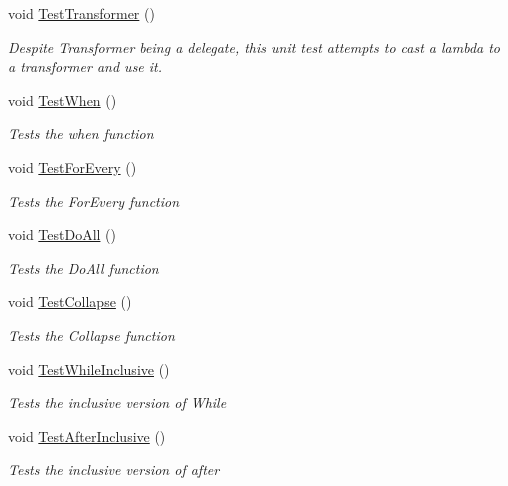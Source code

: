 \begin{DoxyCompactItemize}
\item 
void \hyperlink{classHumDrumTests_1_1Collections_1_1HigherOrder_a09af15fa7e15d1ae88a4a7718465654b}{Test\+Transformer} ()
\begin{DoxyCompactList}\small\item\em Despite Transformer being a delegate, this unit test attempts to cast a lambda to a transformer and use it. \end{DoxyCompactList}\item 
void \hyperlink{classHumDrumTests_1_1Collections_1_1HigherOrder_a35e3afe33158ce1accc409bc869216a7}{Test\+When} ()
\begin{DoxyCompactList}\small\item\em Tests the when function \end{DoxyCompactList}\item 
void \hyperlink{classHumDrumTests_1_1Collections_1_1HigherOrder_a519e1c69f362f59539ae3eaa4869c0cb}{Test\+For\+Every} ()
\begin{DoxyCompactList}\small\item\em Tests the For\+Every function \end{DoxyCompactList}\item 
void \hyperlink{classHumDrumTests_1_1Collections_1_1HigherOrder_ac3555e9c4aec3e6aa8de2e95d929f502}{Test\+Do\+All} ()
\begin{DoxyCompactList}\small\item\em Tests the Do\+All function \end{DoxyCompactList}\item 
void \hyperlink{classHumDrumTests_1_1Collections_1_1HigherOrder_af65ffefc188272daf9b07528d102f9ed}{Test\+Collapse} ()
\begin{DoxyCompactList}\small\item\em Tests the Collapse function \end{DoxyCompactList}\item 
void \hyperlink{classHumDrumTests_1_1Collections_1_1HigherOrder_a9de424bcbef678ad1207d2a4000bb760}{Test\+While\+Inclusive} ()
\begin{DoxyCompactList}\small\item\em Tests the inclusive version of While \end{DoxyCompactList}\item 
void \hyperlink{classHumDrumTests_1_1Collections_1_1HigherOrder_aa93ecf5ef2d168796281d23c624bbbb3}{Test\+After\+Inclusive} ()
\begin{DoxyCompactList}\small\item\em Tests the inclusive version of after \end{DoxyCompactList}\item 

\end{DoxyCompactItemize}
